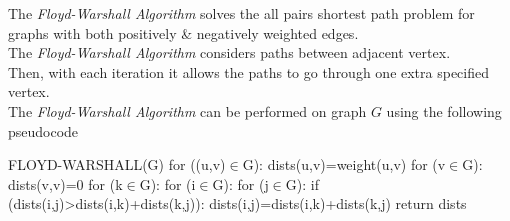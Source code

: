 \documentclass[11pt,a4paper]{article}
\begin{document}
The \textit{Floyd-Warshall Algorithm} solves the all pairs shortest path problem for graphs with both positively \& negatively weighted edges.\\
The \textit{Floyd-Warshall Algorithm} considers paths between adjacent vertex.\\
Then, with each iteration it allows the paths to go through one extra specified vertex.\\
The \textit{Floyd-Warshall Algorithm} can be performed on graph $G$ using the following pseudocode
\begin{code}
FLOYD-WARSHALL(G)
for ((u,v)$\in$G):
  dists(u,v)=weight(u,v)
for (v$\in$G):
  dists(v,v)=0
for (k$\in$G):
  for (i$\in$G):
    for (j$\in$G):
      if (dists(i,j)>dists(i,k)+dists(k,j)):
        dists(i,j)=dists(i,k)+dists(k,j)
return dists
\end{code}
\end{document}
